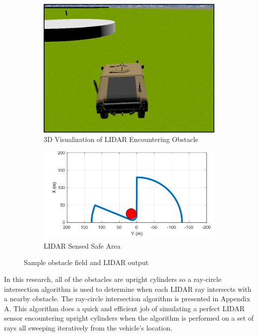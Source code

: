\documentclass[12pt,onecolumn]{report}
\begin{document}
\begin{figure}[t]
	\centering
	\begin{subfigure}[t]{0.45\textwidth}
		\centering
		\includegraphics[width=\columnwidth]{Figs/incomingObst.png}
		\caption{{\small 3D Visualization of LIDAR Encountering Obstacle}}   
		\label{fig:obstacle_field_3D}
	\end{subfigure}
	\hfill
	\begin{subfigure}[t]{0.45\textwidth}
		\centering
		\includegraphics[width=\columnwidth]{Figs/obstLIDAR.png}
		\caption{\small LIDAR Sensed Safe Area}   
		\label{fig:obstacle_field_LIDAR}
	\end{subfigure}
	\caption{\small Sample obstacle field and LIDAR output}
	\label{fig:LIDARExample}
\end{figure}

In this research, all of the obstacles are upright cylinders so a ray-circle intersection algorithm is used to determine when each LIDAR ray intersects with a nearby obstacle. The ray-circle intersection algorithm is presented in Appendix A. This algorithm does a quick and efficient job of simulating a perfect LIDAR sensor encountering upright cylinders when the algorithm is performed on a set of rays all sweeping iteratively from the vehicle's location.
\end{document}
